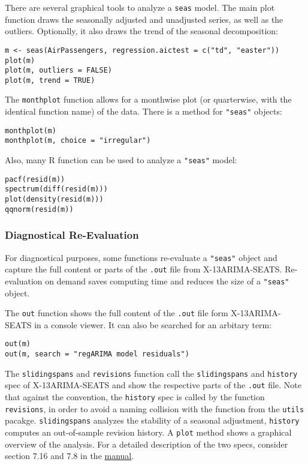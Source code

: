 There are several graphical tools to analyze a \texttt{seas} model. The
main plot function draws the seasonally adjusted and unadjusted series,
as well as the outliers. Optionally, it also draws the trend of the
seasonal decomposition:

\begin{verbatim}
m <- seas(AirPassengers, regression.aictest = c("td", "easter"))
plot(m)
plot(m, outliers = FALSE)
plot(m, trend = TRUE)
\end{verbatim}

The \texttt{monthplot} function allows for a monthwise plot (or
quarterwise, with the identical function name) of the data. There is a
method for \texttt{"seas"} objects:

\begin{verbatim}
monthplot(m)
monthplot(m, choice = "irregular")
\end{verbatim}

Also, many R function can be used to analyze a \texttt{"seas"} model:

\begin{verbatim}
pacf(resid(m))
spectrum(diff(resid(m)))
plot(density(resid(m)))
qqnorm(resid(m))
\end{verbatim}

\subsubsection{Diagnostical
Re-Evaluation}\label{diagnostical-re-evaluation}

For diagnostical purposes, some functions re-evaluate a \texttt{"seas"}
object and capture the full content or parts of the \texttt{.out} file
from X-13ARIMA-SEATS. Re-evaluation on demand saves computing time and
reduces the size of a \texttt{"seas"} object.

The \texttt{out} function shows the full content of the \texttt{.out}
file form X-13ARIMA-SEATS in a console viewer. It can also be searched
for an arbitary term:

\begin{verbatim}
out(m)
out(m, search = "regARIMA model residuals")
\end{verbatim}

The \texttt{slidingspans} and \texttt{revisions} function call the
\texttt{slidingspans} and \texttt{history} spec of X-13ARIMA-SEATS and
show the respective parts of the \texttt{.out} file. Note that against
the convention, the \texttt{history} spec is called by the function
\texttt{revisions}, in order to avoid a naming collision with the
function from the \texttt{utils} pacakge. \texttt{slidingspans} analyzes
the stability of a seasonal adjustment, \texttt{history} computes an
out-of-sample revision history. A \texttt{plot} method shows a graphical
overview of the analysis. For a detailed description of the two specs,
consider section 7.16 and 7.8 in the
\href{http://www.census.gov/ts/x13as/docX13AS.pdf}{manual}.

